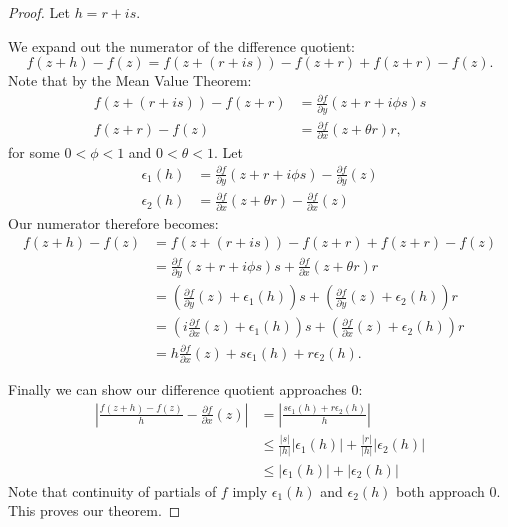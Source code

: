 \begin{proof}
    Let $h = r+is$.

    We expand out the numerator of the difference quotient:
    \[ f(z+h) - f(z) = f(z + (r+is)) - f(z+r) + f(z+r) - f(z). \]
    Note that by the Mean Value Theorem:
    \begin{align*}
        f(z + (r+is)) - f(z+r) &= \frac{\partial f}{\partial y} (z + r + i\phi s) s \\
        f(z + r) - f(z) &= \frac{\partial f}{\partial x} (z + \theta r) r,
    \end{align*}
    for some $0 < \phi < 1$ and $0 < \theta < 1$.
    Let
    \begin{align*}
        \epsilon_1 (h) &= \frac{\partial f}{\partial y} (z + r + i\phi s) - \frac{\partial f}{\partial y}(z) \\
        \epsilon_2 (h) &= \frac{\partial f}{\partial x} (z + \theta r) - \frac{\partial f}{\partial x} (z)
    \end{align*}
    Our numerator therefore becomes:
    \begin{align*}
        f(z+h) - f(z) &= f(z + (r+is)) - f(z+r) + f(z+r) - f(z) \\
        &= \frac{\partial f}{\partial y} (z + r + i\phi s) s + \frac{\partial f}{\partial x} (z + \theta r) r \\
        &= \left( \frac{\partial f}{\partial y}(z) + \epsilon_1 (h) \right)s + \left(\frac{\partial f}{\partial y}(z) + \epsilon_2 (h) \right)r \\
        &= \left( i\frac{\partial f}{\partial x} (z) + \epsilon_1(h) \right) s + 
        \left( \frac{\partial f}{\partial x} (z) + \epsilon_2(h) \right ) r \tag{By Cauchy-Riemann} \\
        &= h \frac{\partial f}{\partial x} (z) + s \epsilon_1(h) + r \epsilon_2(h).
     \end{align*}

     \noindent
     Finally we can show our difference quotient approaches $0$:
     \begin{align*}
        \left| \frac{f(z+h) - f(z)}{h} - \frac{\partial f}{\partial x} (z) \right|
        &= \left| \frac{s \epsilon_1(h) + r \epsilon_2 (h)}{h} \right| \\
        &\le \frac{|s|}{|h|} |\epsilon_1(h)| + \frac{|r|}{|h|} |\epsilon_2(h)| \tag{Triangle Inequality} \\
        &\le |\epsilon_1(h)| + |\epsilon_2(h)|
     \end{align*}
     Note that continuity of partials of $f$ imply $\epsilon_1(h)$ and $\epsilon_2(h)$ both approach $0$.
     This proves our theorem.
\end{proof} 

